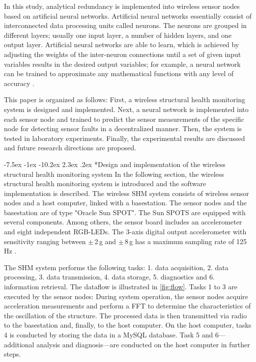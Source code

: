 \documentclass[12pt,a4paper]{scrartcl}
\makeatletter
\renewcommand\section{\@startsection{section}{1}{\z@}%
                     {-7.5ex \@plus -1ex \@minus -10.2ex}%
                     {2.3ex \@plus.2ex}%
                     {\sffamily\large\bfseries}}
\makeatother
\begin{document}
In this study, analytical redundancy is implemented into wireless sensor nodes based on artificial neural networks.
Artificial neural networks essentially consist of interconnected data processing units called neurons. 
The neurons are grouped in different layers; usually one input layer, a number of hidden layers, and one output layer.
Artificial neural networks are able to learn, which is achieved by adjusting the weights of the inter-neuron connections until a set of given input variables results in the desired output variables; for example, a neural network can be trained to approximate any mathematical functions with any level of accuracy \citep{Li2011}.

This paper is organized as follows:
First, a wireless structural health monitoring system is designed and implemented. 
Next, a neural network is implemented into each sensor node and trained to predict the sensor measurements of the specific node for detecting sensor faults in a decentralized manner. 
Then, the system is tested in laboratory experiments. 
Finally, the experimental results are discussed and future research directions are proposed.


\newpage

\section*{Design and implementation of the wireless structural health monitoring system}
In the following section, the wireless structural health monitoring system is introduced and the software implementation is described.
The wireless SHM system consists of wireless sensor nodes and a host computer, linked with a basestation.
The sensor nodes and the basestation are of type "Oracle Sun SPOT". 
The Sun SPOTS are equipped with several components.
Among others, the sensor board includes an accelerometer and eight independent RGB-LEDs.
The 3-axis digital output accelerometer with sensitivity ranging between $\pm$\,2\,g and $\pm$\,8\,g has a maximum sampling rate of 125\,Hz \citep{eDemo2010}.

The SHM system performs the following tasks:
1. data acquisition,
2. data processing,
3. data transmission, 
4. data storage,
5. diagnostics and 
6. information retrieval.
The dataflow is illustrated in \autoref{fig:flow}.
Tasks 1 to 3 are executed by the sensor nodes: During system operation, the sensor nodes acquire acceleration measurements and perform a FFT to determine the characteristics of the oscillation of the structure. 
The processed data is then transmitted via radio to the basestation and, finally, to the host computer.
On the host computer, tasks 4 is conducted by storing the data in a MySQL database.
Task 5 and 6---additional analysis and diagnosis---are conducted on the host computer in further steps.
\end{document}
